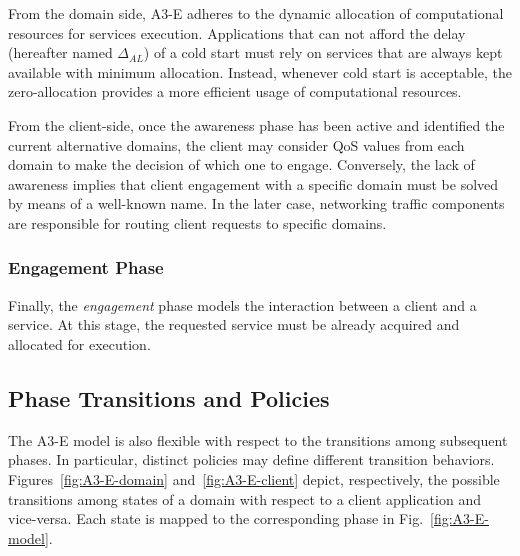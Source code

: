 From the domain side, A3-E adheres to the dynamic allocation of computational resources for services execution. Applications that can not afford the delay (hereafter named $\Delta_{AL}$) of a cold start must rely on services that are always kept available with minimum allocation. Instead, whenever cold start is acceptable, the zero-allocation provides a more efficient usage of computational resources.

From the client-side, once the awareness phase has been active and identified the current alternative domains, the client may consider QoS values from each domain to make the decision of which one to engage. Conversely, the lack of awareness implies that client engagement with a specific domain must be solved by means of a well-known name. In the later case, networking traffic components are responsible for routing client requests to specific domains.

\subsubsection{Engagement Phase}\label{sec:A3-E-engagement}

Finally, the \textit{engagement} phase models the interaction between a client and a service. At this stage, the requested service must be already acquired and allocated for execution. 

\subsection{Phase Transitions and Policies}

The A3-E model is also flexible with respect to the transitions among subsequent phases. In particular, distinct policies may define different transition behaviors. Figures~\ref{fig:A3-E-domain} and~\ref{fig:A3-E-client} depict, respectively, the possible transitions among states of a domain with respect to a client application and vice-versa. Each state is mapped to the corresponding phase in Fig.~\ref{fig:A3-E-model}.

